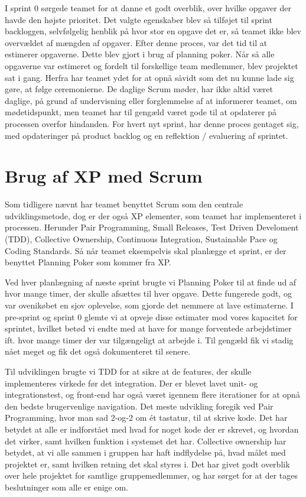I sprint 0 sørgede teamet for at danne et godt overblik, over hvilke opgaver der havde den højste prioritet. Det valgte egenskaber blev så tilføjet til sprint backloggen, selvfølgelig henblik på hvor stor en opgave det er, så teamet ikke blev overvældet af mængden af opgaver. Efter denne proces, var det tid til at estimerer opgaverne. Dette blev gjort i brug af planning poker. Når så alle opgaverne var estimeret og fordelt til forskellige team medlemmer, blev projektet sat i gang. Herfra har teamet ydet for at opnå såvidt som det nu kunne lade sig gøre, at følge ceremonierne. De daglige Scrum møder, har ikke altid været daglige, på grund af undervisning eller forglemmelse af at informerer teamet, om mødetidspunkt, men teamet har til gengæld været gode til at opdaterer på processen overfor hindanden. For hvert nyt sprint, har denne proces gentaget sig, med opdateringer på product backlog og en reflektion / evaluering af sprintet. 



\section{Brug af XP med Scrum}

Som tidligere nævnt har teamet benyttet Scrum som den centrale udviklingsmetode, dog er der også XP elementer, som teamet har implementeret i processen. Herunder Pair Programming, Small Releases, Test Driven Develoment (TDD), Collective Ownership, Continuous Integration, Sustainable Pace og Coding Standards. Så når teamet eksempelvis skal planlægge et sprint, er der benyttet Planning Poker som kommer fra XP. 

Ved hver planlægning af næste sprint brugte vi Planning Poker til at finde ud af hvor mange timer, der skulle afsættes til hver opgave. Dette fungerede godt, og var ovenikøbet en sjov oplevelse, som gjorde det nemmere at lave estimaterne. I pre-sprint og sprint 0 glemte vi at opveje disse estimater mod vores kapacitet for sprintet, hvilket betød vi endte med at have for mange forventede arbejdstimer ift. hvor mange timer der var tilgængeligt at arbejde i. Til gengæld fik vi stadig nået meget og fik det også dokumenteret til senere. 

Til udviklingen brugte vi TDD for at sikre at de features, der skulle implementeres virkede før det integration. Der er blevet lavet unit- og integrationstest, og front-end har også været igennem flere iterationer for at opnå den bedste brugervenlige navigation. 
Det meste udvikling foregik ved Pair Programming, hvor man sad 2-og-2 om ét tastatur, til at skrive kode. Det har betydet at alle er indforstået med hvad for noget kode der er skrevet, og hvordan det virker, samt hvilken funktion i systemet det har. 
Collective ownership har betydet, at vi alle sammen i gruppen har haft indflydelse på, hvad målet med projektet er, samt hvilken retning det skal styres i. Det har givet godt overblik over hele projektet for samtlige gruppemedlemmer, og har sørget for at der tages beslutninger som alle er enige om.

